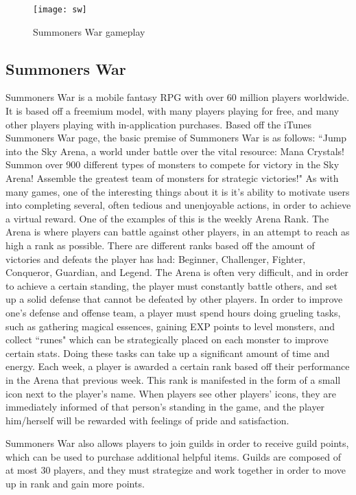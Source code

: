 \begin{figure}[h]
\centering
\texttt{[image: sw]}
\caption{Summoners War gameplay}
\end{figure}

\subsection{Summoners War}
Summoners War is a mobile fantasy RPG with over 60 million players worldwide. It is based off a freemium model, with many players playing for free, and many other players playing with in-application purchases. Based off the iTunes Summoners War page, the basic premise of Summoners War is as follows: ``Jump into the Sky Arena, a world under battle over the vital resource: Mana Crystals! Summon over 900 different types of monsters to compete for victory in the Sky Arena! Assemble the greatest team of monsters for strategic victories!"
	As with many games, one of the interesting things about it is it's ability to motivate users into completing several, often tedious and unenjoyable actions, in order to achieve a virtual reward. One of the examples of this is the weekly Arena Rank. The Arena is where players can battle against other players, in an attempt to reach as high a rank as possible. There are different ranks based off the amount of victories and defeats the player has had: Beginner, Challenger, Fighter, Conqueror, Guardian, and Legend. The Arena is often very difficult, and in order to achieve a certain standing, the player must constantly battle others, and set up a solid defense that cannot be defeated by other players. In order to improve one's defense and offense team, a player must spend hours doing grueling tasks, such as gathering magical essences, gaining EXP points to level monsters, and collect ``runes" which can be strategically placed on each monster to improve certain stats. Doing these tasks can take up a significant amount of time and energy. Each week, a player is awarded a certain rank based off their performance in the Arena that previous week. This rank is manifested in the form of a small icon next to the player's name. When players see other players' icons, they are immediately informed of that person's standing in the game, and the player him/herself will be rewarded with feelings of pride and satisfaction.
	
Summoners War also allows players to join guilds in order to receive guild points, which can be used to purchase additional helpful items. Guilds are composed of at most 30 players, and they must strategize and work together in order to move up in rank and gain more points. 

